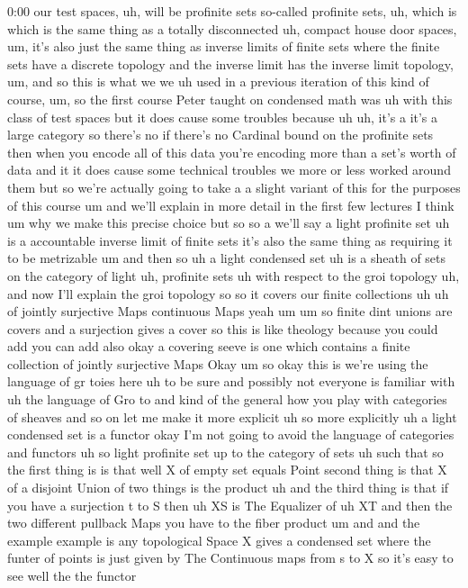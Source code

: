 \begin{unfinished}{0:00}
our test spaces, uh, will be profinite sets so-called profinite sets, uh, which is which is the same thing as a totally disconnected uh, compact house door spaces, um, it's also just the same thing as inverse limits of finite sets where the finite sets have a discrete topology and the inverse limit has the inverse limit topology, um, and so this is what we we uh used in a previous iteration of this kind of course, um, so the first course Peter taught on condensed math was uh with this class of test spaces but it does cause some troubles because uh uh, it's a it's a large category so there's no if there's no Cardinal bound on the profinite sets then when you encode all of this data you're encoding more than a set's worth of data and it it does cause some technical troubles we more or less worked around them but so we're actually going to take a a slight variant of this for the purposes of this course um and we'll explain in more detail in the first few lectures I think um why we make this precise choice but so so a we'll say a light profinite set uh is a accountable inverse limit of finite sets it's also the same thing as requiring it to be metrizable um and then so uh a light condensed set uh is a sheath of sets on the category of light uh, profinite sets uh with respect to the groi topology uh, and now I'll explain the groi topology so so it covers our finite collections uh uh of jointly surjective Maps continuous Maps yeah um um so finite dint unions are covers and a surjection gives a cover so this is like theology because you could add you can add also okay a covering seeve is one which contains a finite collection of jointly surjective Maps Okay um so okay this is we're using the language of gr toies here uh to be sure and possibly not everyone is familiar with uh the language of Gro to and kind of the general how you play with categories of sheaves and so on let me make it more explicit uh so more explicitly uh a light condensed set is a functor okay I'm not going to avoid the language of categories and functors uh so light profinite set up to the category of sets uh such that so the first thing is is that well X of empty set equals Point second thing is that X of a disjoint Union of two things is the product uh and the third thing is that if you have a surjection t to S then uh XS is The Equalizer of uh XT and then the two different pullback Maps you have to the fiber product um and and the example example is any topological Space X gives a condensed set where the funter of points is just given by The Continuous maps from s to X so it's easy to see well the the functor


\end{unfinished}
